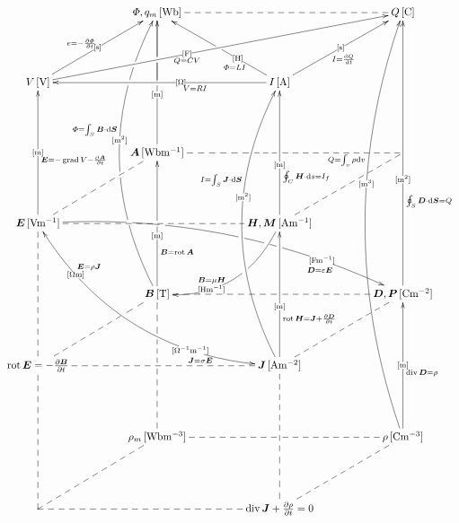 \documentclass[a4j,10pt]{jarticle}
\makeatletter
\def\uni#1{[\!\unit{#1}]}
\def\cell#1#2{#1\,\uni{#2}}
\def\dottedhole#1{\ar@{--}[#1]|!{[ld];[lu]}\hole}
\def\dottedholea#1{\ar@{--}[#1]|!{[ld];[lu]}\hole |!{+(-9.5,-10);+(-9.5,10)}\hole }
\def\dotted#1{\ar@{--}[#1]}
\def\dotteda#1{\ar@{--}[#1] |!{+(11.5,-50);+(11.5,50)}\hole}
\def\arr#1#2#3#4#5{\ar[#1] |-(#2){\uni{#3}} _(#4){#5}}
\def\arruu#1#2#3#4{\arr{uu}{#1}{#2}{#3}{#4}}
\def\arruubefore#1{\arruu{0.4}{m}{0.33}{#1}}
\def\arruubeforemiddlehole{\arruubefore{}|-(0.5)\hole}
\def\arruumiddle#1{\arruu{0.5}{m}{0.45}{#1}}
\def\arrbeforeafter#1#2#3{\arr{#1}{0.4}{#2}{0.40}{#3}}
\def\arrmiddle#1#2#3{\arr{#1}{0.5}{#2}{0.45}{#3}}
\def\arruuuu#1#2#3#4{\arr{uuuu}{#1}{#2}{#3}{#4}}
\def\arruuuubefore#1{\arruuuu{0.4}{m^2}{0.33}{#1}}
\def\arrup#1#2#3#4#5{\ar[#1] |-(#2){\uni{#3}}^(#4){#5}}
\def\arrupbeforebeforebefore#1#2#3{\arrup{#1}{0.3}{#2}{0.3}{#3}}
\def\arrupmiddle#1#2#3{\arrup{#1}{0.5}{#2}{0.45}{#3}}
\def\arrupbeforebefore#1#2#3{\arrup{#1}{0.4}{#2}{0.35}{#3}}
\def\arrcv#1#2#3#4#5{\ar@/^3pc/[#1]|-(#2){\uni{#3}}^(#4){#5}}
\def\arrcvafter#1#2#3{\arrcv{#1}{0.6}{#2}{0.65}{#3}}
\def\arrowyyy#1#2#3{\ar@/^3pc/[#1] |-(0.24)\hole |-(0.25){} |-(0.42)\hole|-(.55){\uni{#2}}^(.58){#3}|!{[luuu];[uuur]}\hole  |-(.768)\hole |-(.78){} |-(.836)\hole}
\def\arrowyy#1#2#3#4#5{\ar@/_3pc/@{<->}[#1]|-(0.2){\uni{#4}}^(0.2){#5}|-(.75){\uni{#2}}_(.75){#3}}
\def\arrowz#1#2#3{\ar@/^2pc/[#1] |!{+(-10,-10);+(-10,10)}\hole|-(.7){\uni{#2}}_(.6){#3}}
\def\arrowzz#1#2#3{\ar@/^2pc/[#1] |-(.2)\hole|-(.3)\hole |-(.545)\hole |-(.625)\hole|!{[rr];[rrdd]}\hole |-(.8){\uni{#2}}_(.8){#3\quad}}
\def\B{\bm B}
\def\A{\bm A}
\def\D{\bm D}
\def\E{\bm E}
\def\H{\bm H}
\def\J{\bm J}
\def\S{\bm S}
\def\P{\bm P}
\def\M{\bm M}
\makeatother
\begin{document}
\begin{center}
\[\xymatrix@=0.70in{
  & \cell{\varPhi, q_m}{Wb}\dotted{rr}\ar@{-}[d]|!{[ld];[rr]}\hole   &        & \cell{Q}{C}\\
 \cell V V\arrupmiddle{ur}{s}{e=-\fracpd\varPhi t}\arrbeforeafter{rrru}{F}{Q=CV}      &          & \cell I A\arrupbeforebefore{ll}{O}{V=RI}\arrmiddle{ur}{s}{I=\diff Q t}\arrupbeforebeforebefore{lu}{H}{\varPhi=LI}|-(0.5)\hole        & \\
 & \cell{\A}{Wbm^{-1}} \arruubeforemiddlehole|!{[lu];[ruru]}\hole       & *=0{}       & \dottedholea{ll}\dotted{ld}\\
 \cell{\E}{Vm^{-1}}\arruumiddle{\E=-\grad V-\frac{\partial\bm A}{\partial t}}\dotted{rr} |!{+(20,-10);+(20,10)}\hole |!{+(32.5,-10);+(32.5,10)}\hole \dotted{ru}\arrowzz{rrrd}{Fm^{-1}}{\D=\varepsilon\E}\arrowyy{rrdd}{O^{-1}m^{-1}}{\J=\sigma\E}{Om}{\E=\rho\J } &          & \cell{\H,\M}{Am^{-1}}\arruubefore{\oint_C\H\cdot\dd s=I_f}\arrowz{dl}{Hm^{-1}}{\B=\mu\H}       & \\
 & \cell{\B}{T}\arruubeforemiddlehole_(.3){\bm B=\rot \bm A} \arrowyyy{uuuu}{m^2}{\varPhi=\int_S\B\cdot\dd\S} &        & \cell{\D,\P}{Cm^{-2}}\arruuuubefore{\oint_S\D\cdot\dd\bm{S}=Q}\dottedhole{ll}\dotted{ld}\\
 {\rot\E=-\frac{\partial\B}{\partial t}}\dotted{uu}\dotted{rr}\dotteda{ru}     &          & \cell{\J}{Am^{-2}}\arruubefore{\rot\H=\J +\frac{\partial\D}{\partial t}}\arrcvafter{uuuu}{m^2}{I=\int_S\J\cdot\dd\S}\\
 & \cell{\rho_m}{Wbm^{-3}}\ar@{--}[uu]|!{[u];[u]}\hole |-(.73)\hole      &        & \cell{\rho}{Cm^{-3}}\arruumiddle{\diver\D=\rho}\arrcvafter{uuuuuu}{m^3}{Q=\int_v\rho\dd v}\dottedhole{ll}\dotted{ld}\\
 *=0{} \dotted{uu}\dotted{rr}\dotted{ru}           &          & \diver\J +\frac{\partial\rho}{\partial t}=0\dotted{uu} |!{+(-10,-10);(10,-10)}\hole      & \\
}\]


\end{center}
\end{document}
